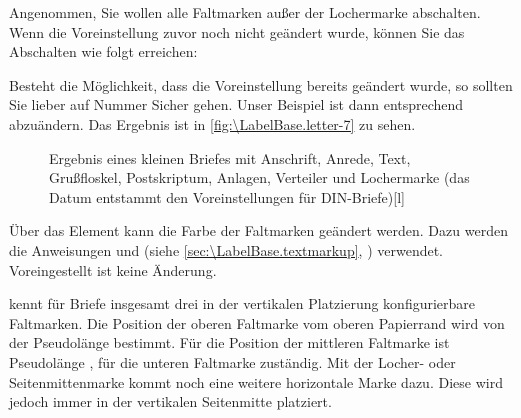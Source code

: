 \begin{Example}
  Angenommen, Sie wollen alle Faltmarken außer der Lochermarke
  abschalten. Wenn die Voreinstellung zuvor noch nicht geändert wurde, können
  Sie das Abschalten wie folgt erreichen:
\begin{lstcode}
\end{lstcode}
  Besteht die Möglichkeit, dass die Voreinstellung bereits geändert wurde, so
  sollten Sie lieber auf Nummer Sicher gehen. Unser Beispiel ist dann
  entsprechend abzuändern.%
  Das Ergebnis ist in \autoref{fig:\LabelBase.letter-7} zu sehen.
  \begin{figure}
    \setcapindent{0pt}%
    \begin{captionbeside}{Ergebnis eines kleinen Briefes mit Anschrift, Anrede,
        Text, Grußfloskel, Postskriptum, Anlagen, Verteiler und Lochermarke
        (das Datum entstammt den Voreinstellungen für DIN-Briefe)}[l]
    \end{captionbeside}
    \label{fig:\LabelBase.letter-7}
  \end{figure}
\end{Example}
%
Über das Element 
kann die Farbe der Faltmarken geändert werden. Dazu werden die Anweisungen
 und
 (siehe
\autoref{sec:\LabelBase.textmarkup}, )
verwendet. Voreingestellt ist keine Änderung.%
\EndIndexGroup


\begin{Declaration}
\end{Declaration}
\KOMAScript{} kennt für Briefe  insgesamt drei in der vertikalen
Platzierung konfigurierbare Faltmarken. Die Position der oberen Faltmarke vom
oberen Papierrand wird von der Pseudolänge 
bestimmt. Für die Position der mittleren Faltmarke ist Pseudolänge
, für die unteren
Faltmarke  zuständig. Mit der
Locher- oder Seitenmittenmarke kommt noch eine weitere
horizontale Marke dazu. Diese wird jedoch immer in der vertikalen Seitenmitte
platziert. 
\iffalse%
Da ihre vertikale Position also nicht konfigurierbar ist, existiert
auch keine Pseudolänge dafür.
\fi

